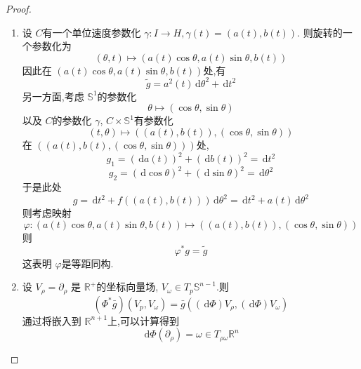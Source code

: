 \documentclass[../../几何与拓扑.tex]{subfiles}
\begin{document}
\begin{proof}
  \begin{enumerate}
    \item   设 \(  C  \)有一个单位速度参数化 \(   \gamma :I\to H, \gamma \left( t \right)= \left( a\left( t \right),b\left( t \right)   \right)    \).  则旋转的一个参数化为 \[
        \left(  \theta ,t \right)\mapsto \left( a\left( t \right)\cos  \theta ,a\left( t \right)\sin  \theta ,b\left( t \right)    \right)  
        \]因此在 \(  \left( a\left( t \right)\cos  \theta ,a\left( t \right)\sin  \theta ,b\left( t \right)    \right)   \)处,有  \[
        \tilde{g}= a^{2}\left( t \right)\,\mathrm{d}  \theta ^{2}+   \,\mathrm{d} t^{2}
        \]
        另一方面,考虑 \(  \mathbb{S}^{1}  \)的参数化 \[
         \theta \mapsto \left( \cos  \theta ,\sin  \theta  \right) 
        \]以及 \(  C  \)的参数化 \(   \gamma   \), \(  C\times \mathbb{S}^{1}  \)有参数化 \[
        \left( t, \theta  \right)\mapsto \left( \left( a\left( t \right),b\left( t \right)   \right),\left( \cos  \theta ,\sin  \theta  \right)   \right)  
        \] 在 \( \left( \left( a\left( t \right),b\left( t \right),\left( \cos  \theta ,\sin  \theta  \right)    \right)  \right)    \)处,  \[
        g_1= \left( \,\mathrm{d} a\left( t \right)  \right)^{2}+ \left( \,\mathrm{d} b\left( t \right)  \right)^{2}= \,\mathrm{d} t^{2}  
        \] \[
        g_2= \left( \,\mathrm{d} \cos  \theta  \right)^{2}+ \left( \,\mathrm{d} \sin  \theta  \right)^{2}=   \,\mathrm{d}  \theta ^{2}
        \]于是此处 \[
        g =  \,\mathrm{d} t^{2}+ f\left( \left( a\left( t \right),b\left( t \right)   \right)  \right)\,\mathrm{d}  \theta ^{2}= \,\mathrm{d} t^{2}+ a\left( t \right)\,\mathrm{d}  \theta ^{2}  
        \]则考虑映射 \[
        \varphi : \left( a\left( t \right)\cos  \theta ,a\left( t \right)\sin  \theta ,b\left( t \right)    \right)\mapsto \left( \left( a\left( t \right),b\left( t \right)   \right),\left( \cos  \theta ,\sin  \theta  \right)   \right)  
        \]则 \[
         \varphi ^{*}g = \tilde{g}
        \]这表明 \(   \varphi   \)是等距同构. 
        \item 设 \(  V_{\rho } =  \partial _{\rho } \) 是 \(  \mathbb{R} ^{+ }  \)的坐标向量场, \(  V_{ \omega }\in T_{p}\mathbb{S}^{n-1}  \).则 \[
        \left( \Phi ^{*} \bar{g} \right) \left( V_{p},V_{ \omega } \right) = \bar{g}\left( \left( \,\mathrm{d} \Phi  \right)V_{\rho },\left( \,\mathrm{d} \Phi  \right)V_{ \omega }   \right) 
        \]  通过将嵌入到 \(  \mathbb{R} ^{n+ 1}  \)上,可以计算得到 \[
        \,\mathrm{d} \Phi \left(  \partial _{\rho } \right)=  \omega \in T_{\rho  \omega } \mathbb{R} ^{n}
\]
\end{enumerate}
\end{proof}
\end{document}
